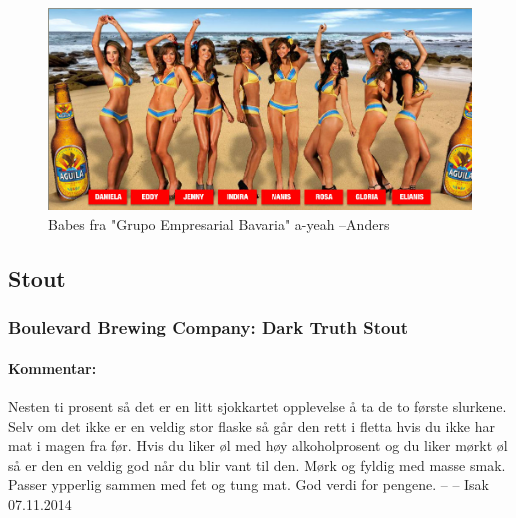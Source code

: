 \documentclass[12pt,a4paper,oneside,norsk]{article}
\begin{document}
\begin{figure} [H]
\centering
\includegraphics[scale=0.31, angle=0]{Bilder/OL/chicas-aguila-2011.jpg}
\caption{Babes fra "Grupo Empresarial Bavaria" a-yeah --Anders}
\end{figure}  

\newpage
\subsection{Stout}
\subsubsection{Boulevard Brewing Company: Dark Truth Stout}
\paragraph{Kommentar:} Nesten ti prosent så det er en litt sjokkartet opplevelse å ta de to første slurkene. Selv om det ikke er en veldig stor flaske så går den rett i fletta hvis du ikke har mat i magen fra før. Hvis du liker øl med høy alkoholprosent og du liker mørkt øl så er den en veldig god når du blir vant til den. Mørk og fyldig med masse smak. Passer ypperlig sammen med fet og tung mat. God verdi for pengene. 
\newline
-- -- Isak 07.11.2014
\end{document}
